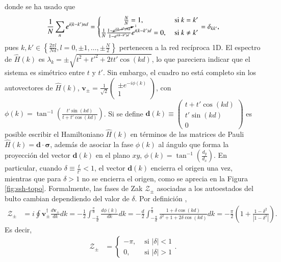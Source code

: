 donde se ha usado que $$\frac{1}{N}\sum_n e^{i(k-k')nd} = \left\{\begin{matrix} \frac{N}{N}=1, &\text{ si } k = k'
\\ \frac{1}{N}\frac{1-\cancelto{1}{e^{i(k-k')Nd}}}{1-e^{i(k-k')d}}e^{i(k-k')d}=0, &\text{ si } k\neq k'
\end{matrix}\right. =\delta_{kk'},$$ pues $k, k' \in  \left\{\frac{2\pi l}{Nd}, l=0,\pm 1, \dots , \pm \frac{N}{2}\right\}$ pertenecen a la red recíproca 1D. El espectro de $\hat{H}(k)$ es $\lambda_k = \pm\sqrt{t^2+t'^2+2tt'\cos(kd)}$, lo que pareciera indicar que el sistema es simétrico entre $t$ y $t'$. Sin embargo, el cuadro no está completo sin los autovectores de $\hat{H}(k)$, $\textbf{v}_\pm =\frac{1}{\sqrt{2}} \begin{pmatrix} \pm e^{-i\phi(k)} \\  1 \end{pmatrix}$, con $\phi(k)=\tan^{-1}\left(\frac{t'\sin(kd)}{t+t'\cos(kd)}\right)$. Si se define $\textbf{d}(k) \equiv \begin{pmatrix}t+t'\cos(kd) \\ t'\sin(kd) \\ 0 \end{pmatrix}$ es posible escribir el Hamiltoniano $\hat{H}(k)$ en términos de las matrices de Pauli $\hat{H}(k) = \textbf{d} \cdot \bm{\sigma}$, además de asociar la fase $\phi(k)$ al ángulo que forma la proyección del vector $\textbf{d}(k)$ en el plano $xy$,  $\phi(k)=\tan^{-1}\left( \frac{d_y}{d_x} \right)$. En particular, cuando $\delta \equiv \frac{t}{t'} < 1$, el vector $\textbf{d}(k)$ encierra el origen una vez, mientras que para $\delta > 1$ no se encierra el origen, como se aprecia en la Figura \ref{fig:ssh-topo}. Formalmente, las fases de Zak $\mathcal{Z}_\pm$ asociadas a los autoestados del bulto cambian dependiendo del valor de $\delta$. Por definición \citep{zak_berry}, \begin{align*}
\mathcal{Z}_\pm &= i \oint \textbf{v}_\pm^\dagger \frac{d \textbf{v}_\pm}{dk}  dk  = -\frac{1}{2} \int_{-\frac{\pi}{d}}^{{\frac{\pi}{d}}}  \frac{d \phi(k)}{d k} dk = -\frac{d}{2}\int_{-\frac{\pi}{d}}^{{\frac{\pi}{d}}} \frac{1+\delta\cos(kd)}{\delta^2+1+2\delta\cos(kd)} dk = -\frac{\pi}{2} \left(1 + \frac{1-\delta^2}{\left|1-\delta^2\right|} \right) .
\end{align*}
Es decir, 
\begin{align*}
\mathcal{Z}_\pm &= \left\{\begin{matrix}
-\pi, &\text{ si } |\delta| < 1
\\
0, &\text{ si } |\delta| > 1
\end{matrix}\right. .
\end{align*}
